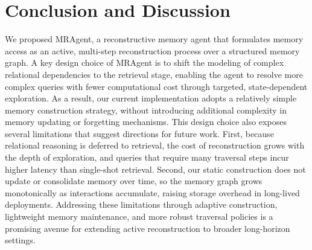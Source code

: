 \section{Conclusion and Discussion}
We proposed MRAgent, a reconstructive memory agent that formulates memory access as an active, multi-step reconstruction process over a structured memory graph.
A key design choice of MRAgent is to shift the modeling of complex relational dependencies to the retrieval stage, enabling the agent to resolve more complex queries with fewer computational cost through targeted, state-dependent exploration.
As a result, our current implementation adopts a relatively simple memory construction strategy, without introducing additional complexity in memory updating or forgetting mechanisms.
This design choice also exposes several limitations that suggest directions for
future work. First, because relational reasoning is deferred to retrieval, the
cost of reconstruction grows with the depth of exploration, and queries that require many traversal steps incur higher latency than single-shot retrieval.
Second, our static construction does not update or consolidate memory over time, so the memory graph grows monotonically as interactions accumulate, raising storage overhead in long-lived deployments.  Addressing these limitations
through adaptive construction, lightweight memory maintenance, and more robust traversal policies is a promising avenue for extending active reconstruction to
broader long-horizon settings.